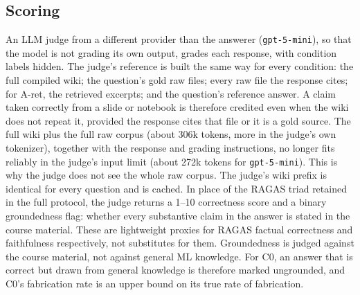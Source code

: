 \documentclass[letterpaper]{article} %
\begin{document}
\subsection{Scoring}

An LLM judge from a different provider than the answerer (\texttt{gpt-5-mini}), so that the model is not grading its own output, grades each response, with condition labels hidden. The judge's reference is built the same way for every condition: the full compiled wiki; the question's gold raw files; every raw file the response cites; for A-ret, the retrieved excerpts; and the question's reference answer. A claim taken correctly from a slide or notebook is therefore credited even when the wiki does not repeat it, provided the response cites that file or it is a gold source. The full wiki plus the full raw corpus (about 306k tokens, more in the judge's own tokenizer), together with the response and grading instructions, no longer fits reliably in the judge's input limit (about 272k tokens for \texttt{gpt-5-mini}). This is why the judge does not see the whole raw corpus. The judge's wiki prefix is identical for every question and is cached. In place of the RAGAS triad \citep{ragas2023} retained in the full protocol, the judge returns a 1--10 correctness score and a binary groundedness flag: whether every substantive claim in the answer is stated in the course material. These are lightweight proxies for RAGAS factual correctness and faithfulness respectively, not substitutes for them. Groundedness is judged against the course material, not against general ML knowledge. For C0, an answer that is correct but drawn from general knowledge is therefore marked ungrounded, and C0's fabrication rate is an upper bound on its true rate of fabrication.
\end{document}
